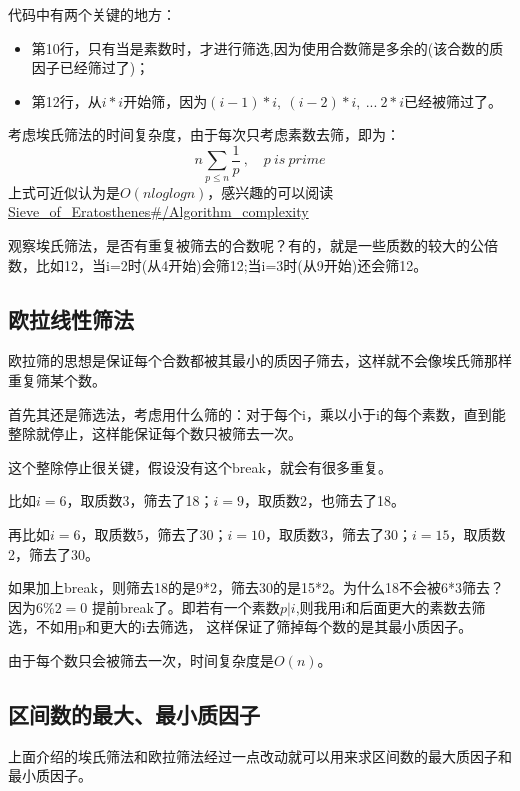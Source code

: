 

\begin{remark}
	代码中有两个关键的地方：
\begin{itemize}
	\item 第10行，只有当是素数时，才进行筛选,因为使用合数筛是多余的(该合数的质因子已经筛过了)；
	\item 第12行，从$i*i$开始筛，因为$(i-1)*i,\ (i-2)*i,\ ...\ 2*i$已经被筛过了。
\end{itemize}
\end{remark}

考虑埃氏筛法的时间复杂度，由于每次只考虑素数去筛，即为：
$$
	n\sum_{p\le n} \frac{1}{p}\ , \quad p \ is \ prime
$$
上式可近似认为是$O(nloglogn)$，感兴趣的可以阅读\href{http://www.wikiwand.com/en/Sieve_of_Eratosthenes#/Algorithm_complexity}{Sieve\_of\_Eratosthenes\#/Algorithm\_complexity} 

\vbox{}

观察埃氏筛法，是否有重复被筛去的合数呢？有的，就是一些质数的较大的公倍数，比如12，当i=2时(从4开始)会筛12;当i=3时(从9开始)还会筛12。

\subsection{欧拉线性筛法}

	欧拉筛的思想是{\heiti 保证每个合数都被其最小的质因子筛去}，这样就不会像埃氏筛那样重复筛某个数。

	首先其还是筛选法，考虑用什么筛的：对于每个i，乘以小于i的每个素数，直到能整除就停止，这样能保证每个数只被筛去一次。
	
	这个整除停止很关键，假设没有这个break，就会有很多重复。
	
	比如$i=6$，取质数3，筛去了18；$i=9$，取质数2，也筛去了18。
	
	再比如$i=6$，取质数5，筛去了30；$i=10$，取质数3，筛去了30；$i=15$，取质数2，筛去了30。
	
	如果加上break，则筛去18的是9*2，筛去30的是15*2。为什么18不会被6*3筛去？ 因为$6\%2=0$
	提前break了。即若有一个素数$p|i$,则我用i和后面更大的素数去筛选，不如用p和更大的i去筛选，
	这样保证了筛掉每个数的是其最小质因子。
	
	


由于每个数只会被筛去一次，时间复杂度是$O(n)$。

\subsection{区间数的最大、最小质因子}
上面介绍的埃氏筛法和欧拉筛法经过一点改动就可以用来求区间数的最大质因子和最小质因子。

